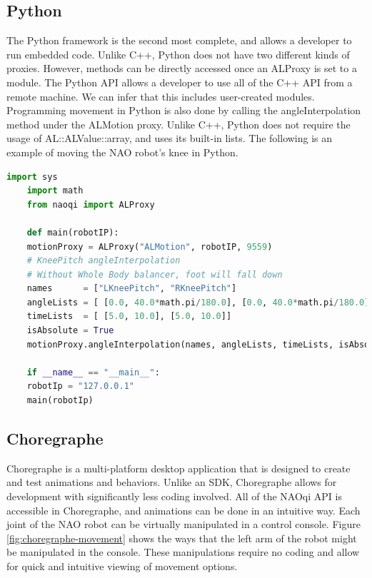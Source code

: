 \documentclass[onecolumn, draftclsnofoot,10pt, compsoc]{IEEEtran}
\begin{document}
\subsection{Python}
The Python framework is the second most complete, and allows a developer to run embedded code.
Unlike C++, Python does not have two different kinds of proxies.
However, methods can be directly accessed once an ALProxy is set to a module.
The Python API allows a developer to use all of the C++ API from a remote machine.
We can infer that this includes user-created modules.
Programming movement in Python is also done by calling the angleInterpolation method under the ALMotion proxy.
Unlike C++, Python does not require the usage of AL::ALValue::array, and uses its built-in lists.
The following is an example of moving the NAO robot's knee in Python. \cite{NAOSDK:Python}
\begin{lstlisting}[language=Python]
	import sys
	import math
	from naoqi import ALProxy

	def main(robotIP):
    motionProxy = ALProxy("ALMotion", robotIP, 9559)
    # KneePitch angleInterpolation
    # Without Whole Body balancer, foot will fall down
    names      = ["LKneePitch", "RKneePitch"]
    angleLists = [ [0.0, 40.0*math.pi/180.0], [0.0, 40.0*math.pi/180.0]]
    timeLists  = [ [5.0, 10.0], [5.0, 10.0]]
    isAbsolute = True
    motionProxy.angleInterpolation(names, angleLists, timeLists, isAbsolute)

	if __name__ == "__main__":
    robotIp = "127.0.0.1"
    main(robotIp)

\end{lstlisting}

\subsection{Choregraphe}
Choregraphe is a multi-platform desktop application that is designed to create and test animations and behaviors.
Unlike an SDK, Choregraphe allows for development with significantly less coding involved.
All of the NAOqi API is accessible in Choregraphe, and animations can be done in an intuitive way.
Each joint of the NAO robot can be virtually manipulated in a control console. Figure \ref{fig:choregraphe-movement} shows the ways that the left arm of the robot might be manipulated in the console.
These manipulations require no coding and allow for quick and intuitive viewing of movement options.
\end{document}
